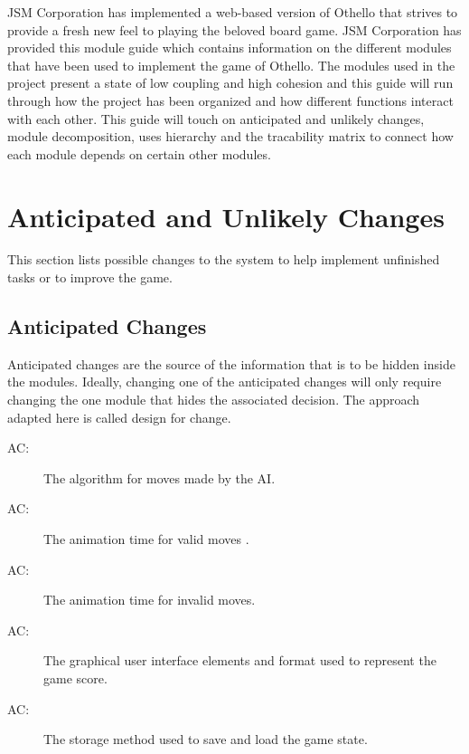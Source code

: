 \documentclass[12pt, titlepage]{article}
\newcounter{acnum}
\newcommand{\actheacnum}{AC\theacnum}
\begin{document}
{{\color{blue}JSM Corporation has implemented a web-based version of Othello that strives to provide a fresh new feel to playing the beloved board game. JSM Corporation has provided this module guide which contains information on the different modules that have been used to implement the game of Othello. The modules used in the project present a state of low coupling and high cohesion and this guide will run through how the project has been organized and how different functions interact with each other. This guide will touch on anticipated and unlikely changes, module decomposition, uses hierarchy and the tracability matrix to connect how each module depends on certain other modules. }


\section{Anticipated and Unlikely Changes} \label{SecChange}

This section lists possible changes to the system to help implement unfinished tasks or to improve the game.

\subsection{Anticipated Changes} \label{SecAchange}

Anticipated changes are the source of the information that is to be hidden
inside the modules. Ideally, changing one of the anticipated changes will only
require changing the one module that hides the associated decision. The approach
adapted here is called design for
change.

\begin{description}
\item[ \actheacnum \label{acInput1}:] The algorithm for moves made by the AI.
\item[ \actheacnum \label{acInput2}:] The animation time for valid moves .
\item[ \actheacnum \label{acInput3}:] The animation time for invalid moves.
\item[ \actheacnum \label{acInput4}:] The graphical user interface elements and format used to represent the game score.
\item[ \actheacnum \label{acInput5}:] The storage method used to save and load the game state.
\end{description}

}
\end{document}
